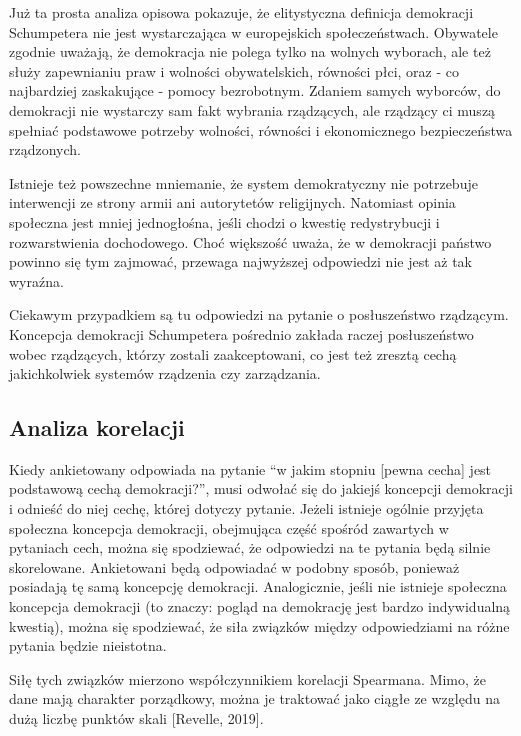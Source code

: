\documentclass[12pt]{article}
\begin{document}
Już ta prosta analiza opisowa pokazuje, że elitystyczna definicja demokracji Schumpetera nie jest wystarczająca w europejskich społeczeństwach. Obywatele zgodnie uważają, że demokracja nie polega tylko na wolnych wyborach, ale też służy zapewnianiu praw i wolności obywatelskich, równości płci, oraz - co najbardziej zaskakujące - pomocy bezrobotnym. Zdaniem samych wyborców, do demokracji nie wystarczy sam fakt wybrania rządzących, ale rządzący ci muszą spełniać podstawowe potrzeby wolności, równości i ekonomicznego bezpieczeństwa rządzonych.

Istnieje też powszechne mniemanie, że system demokratyczny nie potrzebuje interwencji ze strony armii ani autorytetów religijnych. Natomiast opinia społeczna jest mniej jednogłośna, jeśli chodzi o kwestię redystrybucji i rozwarstwienia dochodowego. Choć większość uważa, że w demokracji państwo powinno się tym zajmować, przewaga najwyższej odpowiedzi nie jest aż tak wyraźna.

Ciekawym przypadkiem są tu odpowiedzi na pytanie o posłuszeństwo rządzącym. Koncepcja demokracji Schumpetera pośrednio zakłada raczej posłuszeństwo wobec rządzących, którzy zostali zaakceptowani, co jest też zresztą cechą jakichkolwiek systemów rządzenia czy zarządzania.

\hypertarget{analiza-korelacji}{%
\subsection{Analiza korelacji}\label{analiza-korelacji}}

Kiedy ankietowany odpowiada na pytanie ``w jakim stopniu {[}pewna cecha{]} jest podstawową cechą demokracji?'', musi odwołać się do jakiejś koncepcji demokracji i odnieść do niej cechę, której dotyczy pytanie. Jeżeli istnieje ogólnie przyjęta społeczna koncepcja demokracji, obejmująca część spośród zawartych w pytaniach cech, można się spodziewać, że odpowiedzi na te pytania będą silnie skorelowane. Ankietowani będą odpowiadać w podobny sposób, ponieważ posiadają tę samą koncepcję demokracji. Analogicznie, jeśli nie istnieje społeczna koncepcja demokracji (to znaczy: pogląd na demokrację jest bardzo indywidualną kwestią), można się spodziewać, że siła związków między odpowiedziami na różne pytania będzie nieistotna.

Siłę tych związków mierzono współczynnikiem korelacji Spearmana. Mimo, że dane mają charakter porządkowy, można je traktować jako ciągłe ze względu na dużą liczbę punktów skali {[}Revelle, 2019{]}.
\end{document}
